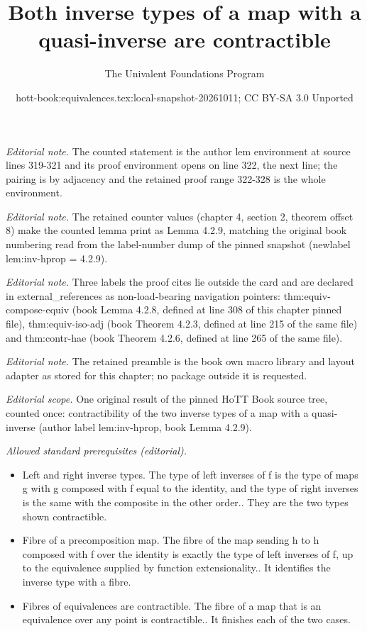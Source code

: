 \documentclass[10pt,a4paper]{article}
\title{Both inverse types of a map with a quasi-inverse are contractible}
\author{The Univalent Foundations Program}
\date{hott-book:equivalences.tex:local-snapshot-20261011; CC BY-SA 3.0 Unported}
\newcounter{chapter}
\theoremstyle{definition}
\theoremstyle{remark}
\numberwithin{equation}{section}
\begin{document}
\maketitle
\setcounter{chapter}{4}
\setcounter{section}{2}
\setcounter{thm}{8}
\noindent\textit{Editorial note.} The counted statement is the author lem environment at source lines 319-321 and its proof environment opens on line 322, the next line; the pairing is by adjacency and the retained proof range 322-328 is the whole environment.\par\medskip
\noindent\textit{Editorial note.} The retained counter values (chapter 4, section 2, theorem offset 8) make the counted lemma print as Lemma 4.2.9, matching the original book numbering read from the label-number dump of the pinned snapshot (newlabel lem:inv-hprop = 4.2.9).\par\medskip
\noindent\textit{Editorial note.} Three labels the proof cites lie outside the card and are declared in external\_references as non-load-bearing navigation pointers: thm:equiv-compose-equiv (book Lemma 4.2.8, defined at line 308 of this chapter pinned file), thm:equiv-iso-adj (book Theorem 4.2.3, defined at line 215 of the same file) and thm:contr-hae (book Theorem 4.2.6, defined at line 265 of the same file).\par\medskip
\noindent\textit{Editorial note.} The retained preamble is the book own macro library and layout adapter as stored for this chapter; no package outside it is requested.\par\medskip
\noindent\textit{Editorial scope.} One original result of the pinned HoTT Book source tree, counted once: contractibility of the two inverse types of a map with a quasi-inverse (author label lem:inv-hprop, book Lemma 4.2.9).\par\medskip
\noindent\textit{Allowed standard prerequisites (editorial).}\begin{itemize}
\item Left and right inverse types. The type of left inverses of f is the type of maps g with g composed with f equal to the identity, and the type of right inverses is the same with the composite in the other order.. They are the two types shown contractible.
\item Fibre of a precomposition map. The fibre of the map sending h to h composed with f over the identity is exactly the type of left inverses of f, up to the equivalence supplied by function extensionality.. It identifies the inverse type with a fibre.
\item Fibres of equivalences are contractible. The fibre of a map that is an equivalence over any point is contractible.. It finishes each of the two cases.
\end{itemize}\medskip
\end{document}
